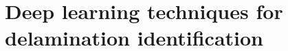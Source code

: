 \documentclass[10pt,aspectratio=169]{beamer} %
\begin{document}
\section{Deep learning techniques for delamination identification}
%
\end{document}
